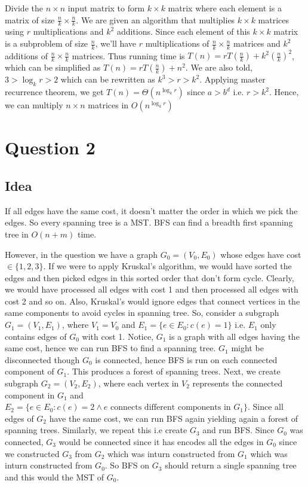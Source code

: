 \documentclass{article}
\begin{document}
    Divide the $n \times n$ input matrix to form $k \times k$ matrix where each element is a matrix of size $\frac{n}{k} \times \frac{n}{k}$. We are given an algorithm that multiplies $k \times k$ matrices using $r$ multiplications and $k^2$ additions. Since each element of this $k \times k$ matrix is a subproblem of size $\frac{n}{k}$, we'll have $r$ multiplications of $\frac{n}{k} \times \frac{n}{k}$ matrices and $k^2$ additions of $\frac{n}{k} \times \frac{n}{k}$ matrices. Thus running time is $T(n) = rT(\frac{n}{k}) + k^2 (\frac{n}{k})^2$, which can be simplified as $T(n) = rT(\frac{n}{k}) + n^2$. We are also told, $3 > \log_k r > 2$ which can be rewritten as $k^3 > r > k^2$. Applying master recurrence theorem, we get $T(n) = \Theta(n^{\log_k r})$ since $a > b^d$ i.e. $r > k^2$. Hence, we can multiply $n \times n$ matrices in $O(n^{\log_k r})$

    \section*{Question 2}

    \subsection*{Idea}
    If all edges have the same cost, it doesn't matter the order in which we pick the edges. So every spanning tree is a MST. BFS can find a breadth first spanning tree in $O(n+m)$ time.
    
    However, in the question we have a graph $G_0 = (V_0, E_0)$ whose edges have cost $\in \{1, 2, 3\}$. If we were to apply Kruskal's algorithm, we would have sorted the edges and then picked edges in this sorted order that don't form cycle. Clearly, we would have processed all edges with cost 1 and then processed all edges with cost 2 and so on. Also, Kruskal's would ignore edges that connect vertices in the same components to avoid cycles in spanning tree. So, consider a subgraph $G_1 = (V_1, E_1)$, where $V_1 = V_0$ and $E_1 = \{e \in E_0 : c(e) = 1\}$ i.e. $E_1$ only contains edges of $G_0$ with cost 1. Notice, $G_1$ is a graph with all edges having the same cost, hence we can run BFS to find a spanning tree. $G_1$ might be disconnected though $G_0$ is connected, hence BFS is run on each connected component of $G_1$. This produces a forest of spanning trees. Next, we create subgraph $G_2 = (V_2, E_2)$, where each vertex in $V_2$ represents the connected component in $G_1$ and $E_2 = \{e \in E_0 : c(e) = 2 \land \text{$e$ connects different components in $G_1$}\}$. Since all edges of $G_2$ have the same cost, we can run BFS again yielding again a forest of spanning trees. Similarly, we repeat this i.e create $G_3$ and run BFS. Since $G_0$ was connected, $G_3$ would be connected since it has encodes all the edges in $G_0$ since we constructed $G_3$ from $G_2$ which was inturn constructed from $G_1$ which was inturn constructed from $G_0$. So BFS on $G_3$ should return a single spanning tree and this would the MST of $G_0$.
    
\end{document}
